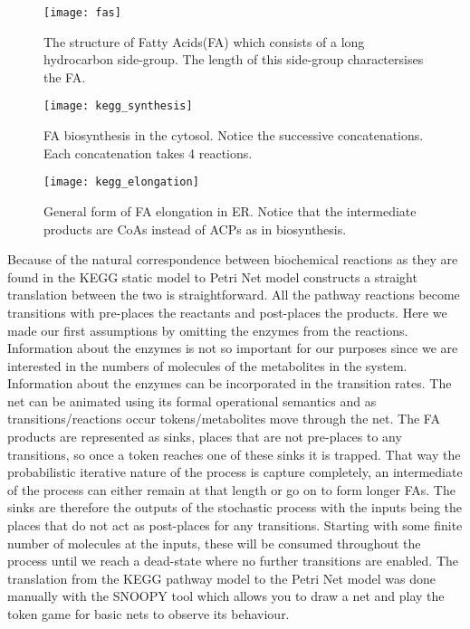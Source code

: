 \begin{figure}[htbp!]
\centering
\texttt{[image: fas]}
\caption[FA structure]{The structure of Fatty Acids(FA) which
  consists of a long hydrocarbon side-group. The length of this
  side-group charactersises the FA.}
\label{fig:fas}
\end{figure}

\begin{figure}[htbp!]
\centering
\texttt{[image: kegg\_synthesis]}
\caption[Fatty Acid biosynthsis in cytosol]{FA biosynthesis in the
  cytosol. Notice the successive concatenations. Each concatenation
  takes 4 reactions.}
\label{fig:kegg_synthesis}
\end{figure}

\begin{figure}[htbp!]
\centering
\texttt{[image: kegg\_elongation]}
\caption[Fatty Acid elongation in ER]{General form of FA elongation in
ER. Notice that the intermediate products are CoAs instead of ACPs as
in biosynthesis.}
\label{fig:kegg_elongation}
\end{figure}

Because of the natural correspondence between biochemical reactions as
they are found in the KEGG static model to Petri Net model constructs
a straight translation between the two is straightforward. All the
pathway reactions become transitions with pre-places the reactants and
post-places the products. Here we made our first assumptions by
omitting the enzymes from the reactions. Information about the enzymes
is not so important for our purposes since we are interested in the
numbers of molecules of the metabolites in the system. Information
about the enzymes can be incorporated in the transition rates.
The net can be animated using its formal
operational semantics and as transitions/reactions occur
tokens/metabolites move through the net. The FA products are
represented as sinks, places that are not pre-places to any
transitions, so once a token reaches one of these sinks it is
trapped. That way the probabilistic iterative nature of the process is
capture completely, an intermediate of the process can either remain
at that length or go on to form longer FAs. The sinks are therefore
the outputs of the stochastic process with the inputs being the places
that do not act as post-places for any transitions. Starting with some
finite number of molecules at the inputs, these will be consumed
throughout the process until we reach a dead-state where no further
transitions are enabled. The translation from the KEGG pathway model
to the Petri Net model was done manually with the SNOOPY \cite []
{heiner2012snoopy}tool which
allows you to draw a net and play the token game for basic nets to
observe its behaviour.

